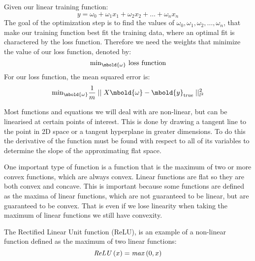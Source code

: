 \documentclass[12pt letter]{report}
\begin{document}

Given our linear training function:
\[
  y = \omega_0 + \omega_1 x_1 + \omega_2 x_2 + \ldots + \omega_n x_n
\]
The goal of the optimization step is to find the values of $\omega_0, \omega_1, \omega_2, \ldots, \omega_n$, that make
our training function best fit the training data, where an optimal fit is charactered by the loss function. Therefore we
need the weights that minimize the value of our loss function, denoted by:
\[
  \text{min}_{\mbold{\omega}} \text{ loss function}
\]
For our loss function, the mean squared error is:
\[
  \text{min}_{\mbold{\omega}} \frac{1}{m}  \mid  \mid X \mbold{\omega} - \mbold{y}_{\text{true}}  \mid  \mid_{l^2}^2
\]




Most functions and equations we will deal with are non-linear, but can be linearised at certain points of interest. This
is done by drawing a tangent line to the point in 2D space or a tangent hyperplane in greater dimensions. To do this the
derivative of the function must be found with respect to all of its variables to determine the slope of the
approximating flat space.

One important type of function is a function that is the maximum of two or more convex functions, which are always
convex. Linear functions are flat so they are both convex and concave. This is important because some functions are
defined as the maxima of linear functions, which are not guaranteed to be linear, but are guaranteed to be convex. That
is even if we lose linearity when taking the maximum of linear functions we still have convexity.

The Rectified Linear Unit function (ReLU), is an example of a non-linear function defined as the maximum of two linear
functions:
\[
  \text{\textit{ReLU}} \left( x \right)  = \text{\textit{max}} \left( 0,x \right)
\]
\end{document}

